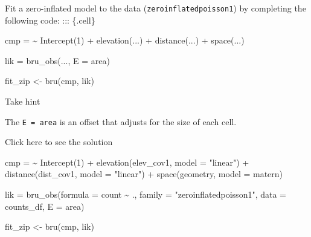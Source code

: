 \documentclass[
  letterpaper,
  DIV=11,
  numbers=noendperiod]{scrartcl}
\newenvironment{Shaded}{\begin{snugshade}}{\end{snugshade}}
\newcommand{\AttributeTok}[1]{\textcolor[rgb]{0.40,0.45,0.13}{#1}}
\newcommand{\DecValTok}[1]{\textcolor[rgb]{0.68,0.00,0.00}{#1}}
\newcommand{\ErrorTok}[1]{\textcolor[rgb]{0.68,0.00,0.00}{#1}}
\newcommand{\FunctionTok}[1]{\textcolor[rgb]{0.28,0.35,0.67}{#1}}
\newcommand{\NormalTok}[1]{\textcolor[rgb]{0.00,0.23,0.31}{#1}}
\newcommand{\OtherTok}[1]{\textcolor[rgb]{0.00,0.23,0.31}{#1}}
\newcommand{\SpecialCharTok}[1]{\textcolor[rgb]{0.37,0.37,0.37}{#1}}
\newcommand{\StringTok}[1]{\textcolor[rgb]{0.13,0.47,0.30}{#1}}
\begin{document}
\begin{tcolorbox}[enhanced jigsaw, arc=.35mm, titlerule=0mm, opacitybacktitle=0.6, colbacktitle=quarto-callout-warning-color!10!white, toptitle=1mm, breakable, opacityback=0, rightrule=.15mm, coltitle=black, leftrule=.75mm, toprule=.15mm, left=2mm, colframe=quarto-callout-warning-color-frame, colback=white, bottomtitle=1mm, title={Task}, bottomrule=.15mm]

Fit a zero-inflated model to the data (\texttt{zeroinflatedpoisson1}) by
completing the following code: ::: \{.cell\}

\begin{Shaded}
\begin{Highlighting}[]
\NormalTok{cmp }\OtherTok{=} \ErrorTok{\textasciitilde{}} \FunctionTok{Intercept}\NormalTok{(}\DecValTok{1}\NormalTok{) }\SpecialCharTok{+} \FunctionTok{elevation}\NormalTok{(...) }\SpecialCharTok{+} \FunctionTok{distance}\NormalTok{(...) }\SpecialCharTok{+} \FunctionTok{space}\NormalTok{(...)}

\NormalTok{lik }\OtherTok{=} \FunctionTok{bru\_obs}\NormalTok{(...,}
    \AttributeTok{E =}\NormalTok{ area)}

\NormalTok{fit\_zip }\OtherTok{\textless{}{-}} \FunctionTok{bru}\NormalTok{(cmp, lik)}
\end{Highlighting}
\end{Shaded}

\end{tcolorbox}

Take hint

The \texttt{E\ =\ area} is an offset that adjusts for the size of each
cell.

Click here to see the solution

\begin{Shaded}
\begin{Highlighting}[]

\NormalTok{cmp }\OtherTok{=} \ErrorTok{\textasciitilde{}} \FunctionTok{Intercept}\NormalTok{(}\DecValTok{1}\NormalTok{) }\SpecialCharTok{+} \FunctionTok{elevation}\NormalTok{(elev\_cov1, }\AttributeTok{model =} \StringTok{"linear"}\NormalTok{) }\SpecialCharTok{+} \FunctionTok{distance}\NormalTok{(dist\_cov1, }\AttributeTok{model =} \StringTok{"linear"}\NormalTok{) }\SpecialCharTok{+} \FunctionTok{space}\NormalTok{(geometry, }\AttributeTok{model =}\NormalTok{ matern)}



\NormalTok{lik }\OtherTok{=} \FunctionTok{bru\_obs}\NormalTok{(}\AttributeTok{formula =}\NormalTok{ count }\SpecialCharTok{\textasciitilde{}}\NormalTok{ .,}
    \AttributeTok{family =} \StringTok{"zeroinflatedpoisson1"}\NormalTok{, }
    \AttributeTok{data =}\NormalTok{ counts\_df,}
    \AttributeTok{E =}\NormalTok{ area)}

\NormalTok{fit\_zip }\OtherTok{\textless{}{-}} \FunctionTok{bru}\NormalTok{(cmp, lik)}
\end{Highlighting}
\end{Shaded}
\end{document}
